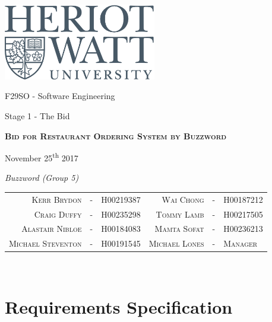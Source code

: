 \documentclass[11pt, a4paper]{report}
\begin{document}
\begin{titlepage}
	\thispagestyle{empty}
	{\centering
		\includegraphics[width=0.5\textwidth]{heriot-watt-logo.png}\par\vspace{1cm}
		\vspace{1cm}
		{\LARGE F29SO - Software Engineering\par}
		{\LARGE Stage 1 - The Bid\par}
		\vspace{1.5cm}
		\vspace{1.5cm}
		{\scshape\LARGE\bfseries Bid for Restaurant Ordering System by Buzzword \par}

		\vspace{3.5cm}
			\begin{center}
					November 25\textsuperscript{th} 2017
			\end{center}
		\vspace{1cm}
		\textit{Buzzword (Group 5)}\par
		\begin{tabulary}{\textwidth}{rcl|rcl}
			\\ \textsc{Kerr Brydon} & - & H00219387&
			\textsc{Wai Chong} & - & H00187212\\
			\textsc{Craig Duffy} & - & H00235298 &
			\textsc{Tommy Lamb} & - & H00217505 \\
			\textsc{Alastair Nibloe} & - & H00184083&
			\textsc{Mamta Sofat} & - & H00236213\\
			\textsc{Michael Steventon} & - & H00191545&
			\textsc{Michael Lones} & - & \textsc{Manager} \\
		\end{tabulary} \\
	
	}
\end{titlepage}

\dominitoc
\tableofcontents

\chapter{Requirements Specification}
\end{document}
